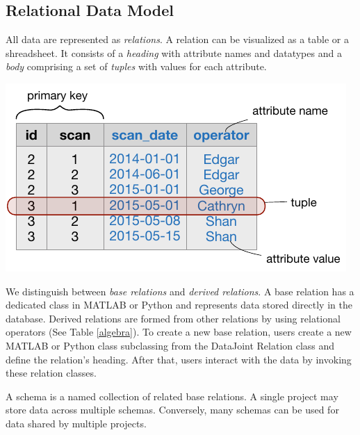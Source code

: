 
\begin{boxedminipage}{\textwidth}
\section*{Relational Data Model}
\begin{description}
\setlength\itemsep{6pt}
\item[Relation] 
All data are represented as \emph{relations}.  A relation can be visualized as a table or a shreadsheet.  
It consists of a \emph{heading} with attribute names and datatypes and a \emph{body} comprising a set of \emph{tuples} with values for each attribute.

\begin{center}
\includegraphics{./figures/relation.pdf}
\end{center}

We distinguish between \emph{base relations} and \emph{derived relations}.  
A base relation has a dedicated class in MATLAB or Python and represents data stored directly in the database.
Derived relations are formed from other relations by using relational operators (See Table \ref{algebra}).
To create a new base relation, users create a new MATLAB or Python class subclassing from the DataJoint Relation class and define the relation's heading. 
After that, users interact with the data by invoking these relation classes.

\item[Schema] A schema is a named collection of related base relations. 
A single project may store data across multiple schemas. Conversely, many schemas can be used for data shared by multiple projects.


\end{description}
\end{boxedminipage}
